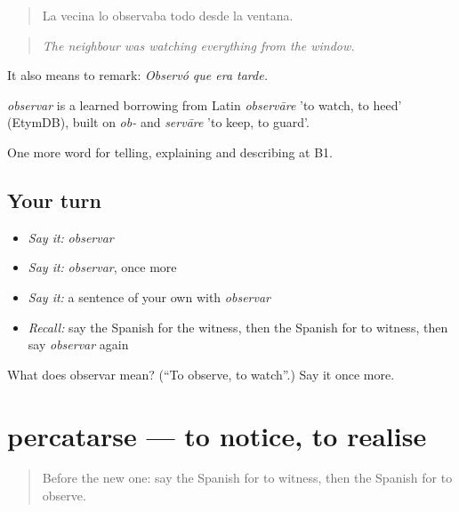 \begin{quote}
La vecina lo observaba todo desde la ventana.
\end{quote}

\begin{quote}
\emph{The neighbour was watching everything from the window.}
\end{quote}

It also means to remark: \emph{Observó que era tarde.}

\begin{cousinweb}
\emph{observar} is a learned borrowing from Latin \emph{observāre} 'to watch, to heed' (EtymDB), built on \emph{ob-} and \emph{servāre} 'to keep, to guard'.
\end{cousinweb}

\begin{grammarlens}[title={What you've built}]
One more word for telling, explaining and describing at B1.
\end{grammarlens}

\subsection*{Your turn}
\begin{itemize}
\raggedright
  \item \emph{Say it:} \emph{observar}
  \item \emph{Say it:} \emph{observar}, once more
  \item \emph{Say it:} a sentence of your own with \emph{observar}
  \item \emph{Recall:} say the Spanish for the witness, then the Spanish for to witness, then say \emph{observar} again
\end{itemize}

\begin{tcolorbox}[breakable,colback=teal!4,colframe=teal!35!black,title={Before you move on}]
What does observar mean? (\textquotedblleft{}To observe, to watch\textquotedblright{}.) Say it once more.
\end{tcolorbox}
\section[percatarse]{percatarse — to notice, to realise}

\label{lesson:ES-C517-percatarse}



\begin{quote}
Before the new one: say the Spanish for to witness, then the Spanish for to observe.
\end{quote}

